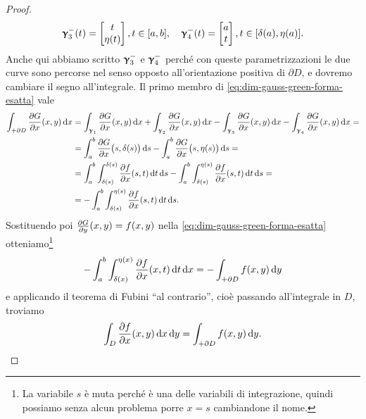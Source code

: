 \begin{proof}
\begin{gather*}
		\bm{\upgamma}_3^-(t)=
		\begin{bmatrix}
			t\\\eta(t)
		\end{bmatrix}, t\in[a,b],\quad 
		\bm{\upgamma}_4^-(t)=
		\begin{bmatrix}
			a\\t
		\end{bmatrix}, t\in[\delta(a),\eta(a)].
	\end{gather*}
	Anche qui abbiamo scritto $\bm{\upgamma}_3^-$ e $\bm{\upgamma}_4^-$ perché con queste parametrizzazioni le due curve sono percorse nel senso opposto all'orientazione positiva di $\partial D$, e dovremo cambiare il segno all'integrale.
	Il primo membro di \eqref{eq:dim-gauss-green-forma-esatta} vale
	\begin{equation}
		\begin{split}
			\int_{+\partial D}\frac{\partial {G}}{\partial {x}}(x,y)\,\textup{d} x&=\int_{\bm{\upgamma}_1}\frac{\partial {G}}{\partial {x}}(x,y)\,\textup{d} x+\int_{\bm{\upgamma}_2}\frac{\partial {G}}{\partial {x}}(x,y)\,\textup{d} x-\int_{\bm{\upgamma}_3}\frac{\partial {G}}{\partial {x}}(x,y)\,\textup{d} x-\int_{\bm{\upgamma}_4}\frac{\partial {G}}{\partial {x}}(x,y)\,\textup{d} x=\\
			&=\int_a^b\frac{\partial {G}}{\partial {x}}\big(s,\delta(s)\big)\,\textup{d} s-\int_a^b\frac{\partial {G}}{\partial {x}}\big(s,\eta(s)\big)\,\textup{d} s=\\
			&=\int_a^b\int_{\delta(s)}^{\delta(s)}\frac{\partial {f}}{\partial {x}}(s,t)\,\textup{d} t\,\textup{d} s-\int_a^b\int_{\delta(s)}^{\eta(s)}\frac{\partial {f}}{\partial {x}}(s,t)\,\textup{d} t\,\textup{d} s=\\
			&=-\int_a^b\int_{\delta(s)}^{\eta(s)}\frac{\partial {f}}{\partial {x}}(s,t)\,\textup{d} t\,\textup{d} s.
		\end{split}
	\end{equation}
	Sostituendo poi $\frac{\partial {G}}{\partial {y}}(x,y)=f(x,y)$ nella \eqref{eq:dim-gauss-green-forma-esatta} otteniamo\footnote{La variabile $s$ è muta perché è una delle variabili di integrazione, quindi possiamo senza alcun problema porre $x=s$ cambiandone il nome.}
	\begin{equation}
		-\int_a^b\int_{\delta(x)}^{\eta(x)}\frac{\partial {f}}{\partial {x}}(x,t)\,\textup{d} t\,\textup{d} x=-\int_{+\partial D}f(x,y)\,\textup{d} y
	\end{equation}
	e applicando il teorema di Fubini ``al contrario'', cioè passando all'integrale in $D$, troviamo
	\begin{equation}
		\int_D\frac{\partial {f}}{\partial {x}}(x,y)\,\textup{d} x\,\textup{d} y=\int_{+\partial D}f(x,y)\,\textup{d} y.
	\end{equation}


\end{proof}
